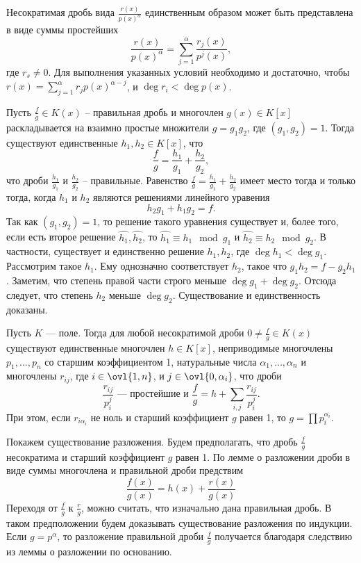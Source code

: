 \crl Несократимая дробь вида $\frac{r(x)}{p(x)^{\alpha}}$ единственным образом может быть представлена в виде суммы простейших
$$\frac{r(x)}{p(x)^{\alpha}}= \sum_{j=1}^{\alpha} \frac{r_j(x)}{p^j(x)},$$
где $r_s \neq 0$.
\proof Для выполнения указанных условий необходимо  и достаточно, чтобы $r(x)=\sum_{j=1}^{\alpha} r_j p(x)^{\alpha-j} $, и $\deg r_i < \deg p(x)$. 
\endproof
\ecrl


 Пусть $\frac{f}{g} \in K(x)$ -- правильная дробь и многочлен $g(x)\in K[x]$ раскладывается на взаимно простые множители $g=g_1g_2$, где $(g_1,g_2)=1$. Тогда существуют единственные $h_1,h_2 \in K[x]$, что $$\frac{f}{g}=\frac{h_1}{g_1}+\frac{h_2}{g_2},$$
что дроби $\frac{h_1}{g_1}$ и $\frac{h_2}{g_2}$ -- правильные.
\elm
\proof Равенство
$ \frac{f}{g}=\frac{h_1}{g_1}+\frac{h_2}{g_2}$
имеет место тогда и только тогда, когда $h_1$ и $h_2$ являются решениями линейного уравения $$h_2g_1+h_1g_2=f.$$
Так как $(g_1,g_2)=1$, то решение такого уравнения существует и, более того, если есть второе решение $\hat{h_1}, \hat{h_2}$, то $\hat{h_1}\equiv h_1\mod g_1$ и $\hat{h_2}\equiv h_2 \mod g_2$. В частности, существует и единственно решение $h_1, h_2$, где $\deg h_1 < \deg g_1$. Рассмотрим такое $h_1$. Ему однозначно соответствует $h_2$, такое что $g_1h_2= f- g_2h_1$. Заметим, что степень правой части строго меньше  $\deg g_1+ \deg g_2$. Отсюда следует, что степень $h_2$ меньше $\deg g_2$. Существование и единственность доказаны.
\endproof


 Пусть $K$ ---  поле. Тогда для любой несократимой дроби $0
\neq \frac{f}{g} \in K(x)$ существуют единственные многочлен $h\in K[x]$, неприводимые многочлены $p_1, \dots, p_n$ со старшим коэффициентом 1, натуральные числа $\alpha_1,\dots, \alpha_n$ и многочлены $r_{ij}$, где $i\in \ovl{1,n}$, и $j\in \ovl{0,\alpha_i}$, что дроби
$$ \frac{r_{ij}}{p_i^{j}} \text{ --- простейшие и } \frac{f}{g}=h+\sum_{i,j} \frac{r_{ij}}{p_i^{j}}.$$
При этом, если  $r_{i\alpha_i}$ не ноль и старший коэффициент $g$  равен 1, то $g=\prod p_i^{\alpha_i}$.
\ethrm

\proof Покажем существование разложения. Будем предполагать, что дробь $\frac{f}{g}$ несократима и старший коэффициент $g$ равен 1. По лемме о разложении дроби в виде суммы многочлена и правильной дроби предствим $$\frac{f(x)}{g(x)}= h(x)+\frac{r(x)}{g(x)}$$
Переходя от $\frac{f}{g}$ к $\frac{r}{g}$, можно считать, что изначально дана правильная дробь.
В таком предположении будем доказывать существование разложения по индукции. Если $g=p^{\alpha}$, то разложение правильной дроби $\frac{f}{g}$ получается благодаря следствию из леммы о разложении по основанию.


